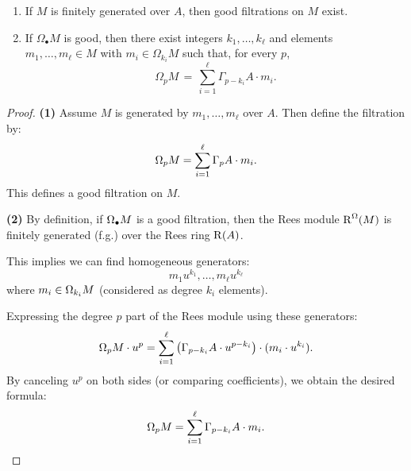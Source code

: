 \begin{lemma}\label{lem:good-filtration-exists}
    \mbox{}
    \begin{enumerate}
        \item If $M$ is finitely generated over $A$, then good filtrations on $M$ exist.
        \item If $\Omega_\bullet M$ is good, then there exist integers $k_1,\dots,k_\ell$ and
              elements $m_1,\dots,m_\ell\in M$ with $m_i\in\Omega_{k_i}M$ such that, for every $p$,
              \[
                  \Omega_pM \,=\, \sum_{i=1}^{\ell} \Gamma_{p-k_i}A\cdot m_i.
              \]
    \end{enumerate}
\end{lemma}
\begin{proof}
    \textbf{(1)} Assume $M$ is generated by $m_1, \dots, m_\ell$ over $A$.
    Then define the filtration by:
    \[
        \Omega_{p} M = \sum_{i=1}^{\ell} \Gamma_{p} A \cdot m_i.
    \]
    This defines a good filtration on $M$.

    \vspace{1em}

    \textbf{(2)} By definition, if $\Omega_{\bullet} M$ is a good filtration, then the Rees module $\operatorname{R}^\Omega(M)$ is finitely generated (f.g.) over the Rees ring $\operatorname{R}(A)$.

    This implies we can find homogeneous generators:
    \[
        m_1 u^{k_1}, \dots, m_\ell u^{k_\ell}
    \]
    where $m_i \in \Omega_{k_i} M$ (considered as degree $k_i$ elements).

    Expressing the degree $p$ part of the Rees module using these generators:
    \[
        \Omega_{p} M \cdot u^p = \sum_{i=1}^{\ell} \left( \Gamma_{p-k_i} A \cdot u^{p-k_i} \right) \cdot (m_i \cdot u^{k_i}).
    \]
    By canceling $u^p$ on both sides (or comparing coefficients), we obtain the desired formula:
    \[
        \Omega_{p} M = \sum_{i=1}^{\ell} \Gamma_{p-k_i} A \cdot m_i.
    \]

\end{proof}

